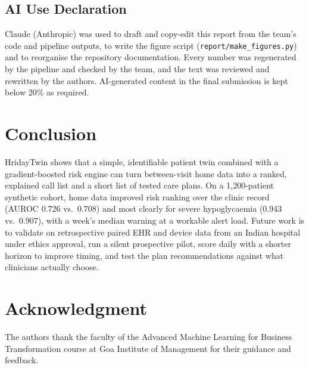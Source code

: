 \documentclass[conference]{IEEEtran}
\begin{document}
\subsection{AI Use Declaration}
\label{sec:ai}
Claude (Anthropic) was used to draft and copy-edit this report from the team's code and pipeline outputs, to write the figure script (\texttt{report/make\_figures.py}) and to reorganise the repository documentation. Every number was regenerated by the pipeline and checked by the team, and the text was reviewed and rewritten by the authors. AI-generated content in the final submission is kept below 20\% as required.

\section{Conclusion}
HridayTwin shows that a simple, identifiable patient twin combined with a gradient-boosted risk engine can turn between-visit home data into a ranked, explained call list and a short list of tested care plans. On a 1{,}200-patient synthetic cohort, home data improved risk ranking over the clinic record (AUROC 0.726 vs.\ 0.708) and most clearly for severe hypoglycaemia (0.943 vs.\ 0.907), with a week's median warning at a workable alert load. Future work is to validate on retrospective paired EHR and device data from an Indian hospital under ethics approval, run a silent prospective pilot, score daily with a shorter horizon to improve timing, and test the plan recommendations against what clinicians actually choose.

\section*{Acknowledgment}
The authors thank the faculty of the Advanced Machine Learning for Business Transformation course at Goa Institute of Management for their guidance and feedback.
\end{document}
